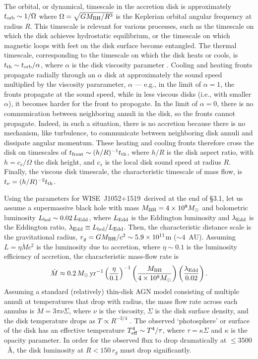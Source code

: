 \documentclass[iop]{emulateapj}
\def\ie{{i.e.}}
\def\eg{{e.g.}}
\def\qso{WISE~J1052+1519}
\begin{document}
The orbital, or dynamical, timescale in the accretion disk is
approximately $t_{\rm orb} \sim 1/\Omega$ where $\Omega=\sqrt{GM_{\rm
BH}/R^{3}}$ is the Keplerian orbital angular frequency at radius
$R$.  This timescale is relevant for various processes, such
as the timescale on which the disk achieves hydrostatic equilibrium,
or the timescale on which magnetic loops with feet on the disk
surface become entangled.  The thermal timescale, corresponding
to the timescale on which the disk heats or cools, is $t_{\rm th}
\sim t_{\rm orb}/\alpha$, where $\alpha$ is the disk viscosity
parameter \citep{Shakura:73}. Cooling and heating fronts
propagate radially through an $\alpha$ disk at approximately the
sound speed multiplied by the viscosity pararameter, $\alpha$
\citep[\eg,][]{Hameury:09} --- \eg, in the limit of $\alpha = 1$,
the fronts propagate at the sound speed, while in less viscous disks
(\ie, with smaller $\alpha$), it becomes harder for the front to
propogate.  In the limit of $\alpha = 0$, there is no communication
between neighboring annuli in the disk, so the fronts cannot
propagate.  Indeed, in such a situation, there is no accretion
because there is no mechanism, like turbulence, to communicate
between neighboring disk annuli and dissipate angular momentum.
These heating and cooling fronts therefore cross the disk on
timescales of $t_{\rm front} \sim (h/R)^{-1} t_{\rm th}$, where
$h/R$ is the disk aspect ratio, with $h = c_{s}/\Omega$ the disk
height, and $c_{s}$ is the local disk sound speed at radius $R$.
Finally, the viscous disk timescale, the characteristic timescale
of mass flow, is $t_{\nu}=(h/R)^{-2}t_{\rm th}$.

Using the parameters for \qso\ derived at the end of \S 3.1, let
us assume a supermassive black hole with mass $M_{\rm BH} = 4 \times
10^{8}M_{\odot}$ and bolometric luminosity $L_{\rm bol} \sim 0.02\,
L_{\rm Edd}$, where $L_{\rm Edd}$ is the Eddington luminosity and
$\lambda_{\rm Edd}$ is the Eddington ratio, $\lambda_{\rm Edd} \equiv
L_{\rm bol} / L_{\rm Edd}$.  Then, the characteristic distance scale
is the gravitational radius, $r_g = GM_{\rm BH}/c^2 \sim 5.9 \times 10^{11}$m
($\sim 4$~AU).  Assuming $L =\eta \dot{M}c^{2}$ is the luminosity
due to accretion, where $\eta \sim 0.1$ is the luminosity efficiency
of accretion, the characteristic mass-flow rate is
\begin{equation}
\dot{M} \approx 0.2\, M_{\odot}\, {\rm yr}^{-1} \left(
\frac{\eta}{0.1}\right)^{-1} \left( \frac{M_{\rm BH}}{4 \times
10^{8}M_{\odot}}\right)\left(\frac{\lambda_{\rm Edd}}{0.02}\right).
\label{eq:m_dot}
\end{equation}
\noindent Assuming a standard (relatively) thin-disk AGN model
consisting of multiple annuli at temperatures that drop with radius,
the mass flow rate across each annulus is $\dot{M} = 3\pi\nu\Sigma$,
where $\nu$ is the viscosity, $\Sigma$ is the disk surface density,
and the disk temperature drops as $T \propto R^{-3/4}$
\citep[\eg,][]{Zimmerman:05}. The observed `photosphere' or surface
of the disk has an effective temperature $T_{\rm eff}^{4} \sim
T^{4}/\tau$, where $\tau=\kappa \Sigma$ and $\kappa$ is the opacity
parameter.  In order for the observed flux to drop dramatically at
$\leq 3500$~\AA, the disk luminosity at $R < 150\, r_{g}$ must drop
significantly.
\end{document}
